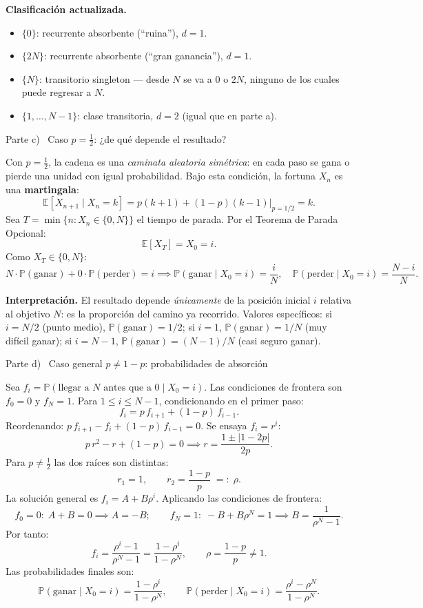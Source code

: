 \documentclass[10pt,a4paper]{article}
\newcommand{\Prob}[1]{\mathbb{P}\!\left(#1\right)}
\newcommand{\E}[1]{\mathbb{E}\!\left[#1\right]}
\newcommand{\parteheader}[1]{%
  \vspace{8pt}\needspace{4cm}\noindent
  \begin{tcolorbox}[
    colback=subsecbg!18, colframe=subsecbg!55,
    sharp corners, boxrule=0.4pt,
    left=6pt, right=6pt, top=3pt, bottom=3pt,
    fontupper=\small\bfseries\sffamily,
  ]
  #1
  \end{tcolorbox}\vspace{2pt}%
}
\begin{document}
\textbf{Clasificaci\'on actualizada.}
\begin{itemize}
  \item $\{0\}$: recurrente absorbente (``ruina''), $d=1$.
  \item $\{2N\}$: recurrente absorbente (``gran ganancia''), $d=1$.
  \item $\{N\}$: transitorio singleton --- desde $N$ se va a $0$ o $2N$, ninguno
        de los cuales puede regresar a $N$.
  \item $\{1,\ldots,N-1\}$: clase transitoria, $d=2$ (igual que en parte a).
\end{itemize}

\parteheader{Parte c) \textperiodcentered\ Caso $p=\tfrac{1}{2}$: ¿de qu\'e depende el resultado?}

Con $p=\tfrac{1}{2}$, la cadena es una \emph{caminata aleatoria sim\'etrica}: en
cada paso se gana o pierde una unidad con igual probabilidad. Bajo esta condici\'on,
la fortuna $X_n$ es una \textbf{martingala}:
\[
  \E{X_{n+1}\mid X_n=k} = p(k+1)+(1-p)(k-1)\big|_{p=1/2} = k.
\]
Sea $T=\min\{n:X_n\in\{0,N\}\}$ el tiempo de parada. Por el Teorema de Parada
Opcional:
\[
  \E{X_T} = X_0 = i.
\]
Como $X_T\in\{0,N\}$:
\[
  N\cdot\Prob{\text{ganar}}+0\cdot\Prob{\text{perder}}=i
  \implies
  \boxed{\Prob{\text{ganar}\mid X_0=i}=\frac{i}{N},\quad
    \Prob{\text{perder}\mid X_0=i}=\frac{N-i}{N}.}
\]

\textbf{Interpretaci\'on.} El resultado depende \emph{\'unicamente} de la posici\'on
inicial $i$ relativa al objetivo $N$: es la proporci\'on del camino ya recorrido.
Valores espec\'ificos: si $i=N/2$ (punto medio), $\Prob{\text{ganar}}=1/2$; si
$i=1$, $\Prob{\text{ganar}}=1/N$ (muy dif\'icil ganar); si $i=N-1$,
$\Prob{\text{ganar}}=(N-1)/N$ (casi seguro ganar).

\parteheader{Parte d) \textperiodcentered\ Caso general $p\ne 1-p$: probabilidades de absorci\'on}

Sea $f_i=\Prob{\text{llegar a }N\text{ antes que a }0\mid X_0=i}$. Las condiciones
de frontera son $f_0=0$ y $f_N=1$. Para $1\le i\le N-1$, condicionando en el
primer paso:
\[
  f_i = p\,f_{i+1}+(1-p)\,f_{i-1}.
\]
Reordenando: $p\,f_{i+1}-f_i+(1-p)\,f_{i-1}=0$. Se ensaya $f_i=r^i$:
\[
  p\,r^2 - r + (1-p) = 0 \implies
  r = \frac{1\pm|1-2p|}{2p}.
\]
Para $p\ne\tfrac{1}{2}$ las dos ra\'ices son distintas:
\[
  r_1 = 1, \qquad r_2 = \frac{1-p}{p} \;=:\; \rho.
\]
La soluci\'on general es $f_i = A + B\rho^i$. Aplicando las condiciones de frontera:
\[
  f_0=0:\; A+B=0 \implies A=-B;\qquad
  f_N=1:\; -B+B\rho^N=1 \implies B=\frac{1}{\rho^N-1}.
\]
Por tanto:
\[
  f_i = \frac{\rho^i-1}{\rho^N-1} = \frac{1-\rho^i}{1-\rho^N},
  \qquad \rho=\frac{1-p}{p}\ne 1.
\]
Las probabilidades finales son:
\[
  \boxed{\Prob{\text{ganar}\mid X_0=i} = \frac{1-\rho^i}{1-\rho^N},
    \qquad
    \Prob{\text{perder}\mid X_0=i} = \frac{\rho^i-\rho^N}{1-\rho^N}.}
\]
\end{document}
